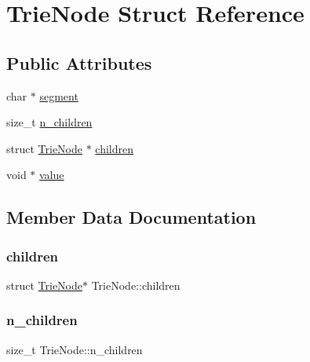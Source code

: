 \hypertarget{structTrieNode}{}\section{Trie\+Node Struct Reference}
\label{structTrieNode}
\subsection*{Public Attributes}
\begin{DoxyCompactItemize}
\item 
char $\ast$ \mbox{\hyperlink{structTrieNode_aee6b01ef1df2e14fc60b7cac7f842f9c}{segment}}
\item 
size\+\_\+t \mbox{\hyperlink{structTrieNode_a5a7fb981e437053d15ead5058eea05ec}{n\+\_\+children}}
\item 
struct \mbox{\hyperlink{structTrieNode}{Trie\+Node}} $\ast$ \mbox{\hyperlink{structTrieNode_aee14127d1ce0f5c51a3391ce130d864d}{children}}
\item 
void $\ast$ \mbox{\hyperlink{structTrieNode_a764f0b34ed1c944c3e1645d9d24d8327}{value}}
\end{DoxyCompactItemize}


\subsection{Member Data Documentation}
\mbox{\label{structTrieNode_aee14127d1ce0f5c51a3391ce130d864d}} 
\subsubsection{\texorpdfstring{children}{children}}
{\footnotesize\ttfamily struct \mbox{\hyperlink{structTrieNode}{Trie\+Node}}$\ast$ Trie\+Node\+::children}

\mbox{\label{structTrieNode_a5a7fb981e437053d15ead5058eea05ec}} 
\subsubsection{\texorpdfstring{n\_children}{n\_children}}
{\footnotesize\ttfamily size\+\_\+t Trie\+Node\+::n\+\_\+children}

\mbox{\label{structTrieNode_aee6b01ef1df2e14fc60b7cac7f842f9c}} 
